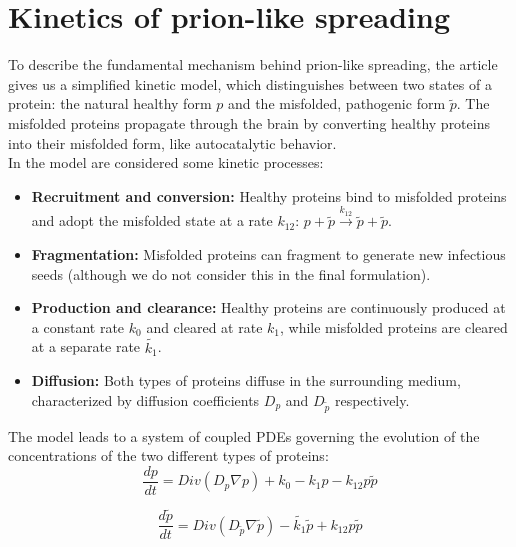 \documentclass[12pt, a4paper, twoside, openright]{report}
\begin{document}
\section{Kinetics of prion-like spreading}
To describe the fundamental mechanism behind prion-like spreading, the article \cite{WEICKENMEIER2019264} gives us a simplified kinetic model, which distinguishes between two states of a protein: the natural healthy form $p$ and the misfolded, pathogenic form $\tilde{p}$.
The misfolded proteins propagate through the brain by converting healthy proteins into their misfolded form, like autocatalytic behavior. \\
In the model are considered some kinetic processes:
\begin{itemize}
    \item \textbf{Recruitment and conversion: }Healthy proteins bind to misfolded proteins and adopt the misfolded state at a rate $k_{12}$: 
    $p + \tilde{p} \overset{k_{12}}{\rightarrow}\tilde{p}+\tilde{p}$.

    \item \textbf{Fragmentation: }Misfolded proteins can fragment to generate new infectious seeds (although we do not consider this in the final formulation).

    \item \textbf{Production and clearance: }Healthy proteins are continuously produced at a constant rate $k_0$ and cleared at rate $k_1$, while misfolded proteins are cleared at a separate rate $\tilde{k_1}$.

    \item \textbf{Diffusion: }Both types of proteins diffuse in the surrounding medium, characterized by diffusion coefficients $D_p$ and $D_{\tilde{p}}$ respectively.
    
\end{itemize}

The model leads to a system of coupled PDEs governing the evolution of the concentrations of the two different types of proteins: \\

\begin{equation}
    \frac{dp}{dt}=Div(D_p\nabla p) + k_0 - k_1p - k_{12}p\tilde{p}
\end{equation}

\begin{equation}
        \frac{d\tilde{p}}{dt}=Div(D_{\tilde{p}} \nabla \tilde{p}) - \tilde{k_1}\tilde{p} + k_{12}p\tilde{p}
\end{equation}
\end{document}

